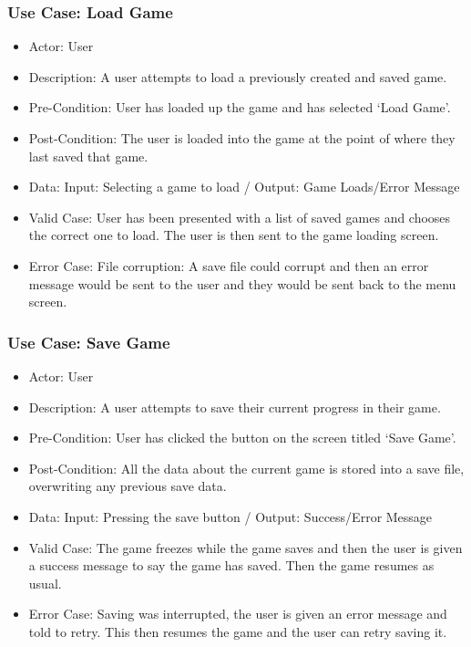 \documentclass{article}
\begin{document}
\subsubsection{Use Case: Load Game}
\begin{itemize}
	\item Actor: User
	\item Description: A user attempts to load a previously created and saved game.
	\item Pre-Condition: User has loaded up the game and has selected ‘Load Game’.
	\item Post-Condition: The user is loaded into the game at the point of where they last saved that game.
	\item Data: Input: Selecting a game to load / Output: Game Loads/Error Message
	\item Valid Case: User has been presented with a list of saved games and chooses the correct one to load. The user is then sent to the game loading screen.
	\item Error Case: File corruption: A save file could corrupt and then an error message would be sent to the user and they would be sent back to the menu screen.
\end{itemize}
\subsubsection{Use Case: Save Game}
\begin{itemize}
	\item Actor: User
	\item Description: A user attempts to save their current progress in their game.
	\item Pre-Condition: User has clicked the button on the screen titled ‘Save Game’.
	\item Post-Condition: All the data about the current game is stored into a save file, overwriting any previous save data.
	\item Data: Input: Pressing the save button / Output: Success/Error Message
	\item Valid Case: The game freezes while the game saves and then the user is given a success message to say the game has saved. Then the game resumes as usual.
	\item Error Case: Saving was interrupted, the user is given an error message and told to retry. This then resumes the game and the user can retry saving it.
\end{itemize}
\end{document}
